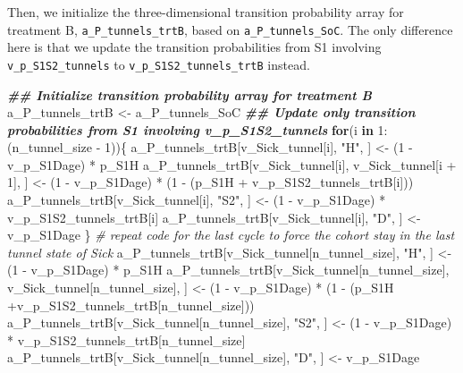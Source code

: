 \documentclass[
]{article}
\newenvironment{Shaded}{\begin{snugshade}}{\end{snugshade}}
\newcommand{\CommentTok}[1]{\textcolor[rgb]{0.56,0.35,0.01}{\textit{#1}}}
\newcommand{\ControlFlowTok}[1]{\textcolor[rgb]{0.13,0.29,0.53}{\textbf{#1}}}
\newcommand{\DecValTok}[1]{\textcolor[rgb]{0.00,0.00,0.81}{#1}}
\newcommand{\DocumentationTok}[1]{\textcolor[rgb]{0.56,0.35,0.01}{\textbf{\textit{#1}}}}
\newcommand{\NormalTok}[1]{#1}
\newcommand{\OtherTok}[1]{\textcolor[rgb]{0.56,0.35,0.01}{#1}}
\newcommand{\SpecialCharTok}[1]{\textcolor[rgb]{0.00,0.00,0.00}{#1}}
\newcommand{\StringTok}[1]{\textcolor[rgb]{0.31,0.60,0.02}{#1}}
\begin{document}
Then, we initialize the three-dimensional transition probability array for treatment B, \texttt{a\_P\_tunnels\_trtB}, based on \texttt{a\_P\_tunnels\_SoC}. The only difference here is that we update the transition probabilities from S1 involving \texttt{v\_p\_S1S2\_tunnels} to \texttt{v\_p\_S1S2\_tunnels\_trtB} instead.

\begin{Shaded}
\begin{Highlighting}[]
\DocumentationTok{\#\# Initialize transition probability array for treatment B}
\NormalTok{a\_P\_tunnels\_trtB }\OtherTok{\textless{}{-}}\NormalTok{ a\_P\_tunnels\_SoC}
\DocumentationTok{\#\# Update only transition probabilities from S1 involving v\_p\_S1S2\_tunnels}
\ControlFlowTok{for}\NormalTok{(i }\ControlFlowTok{in} \DecValTok{1}\SpecialCharTok{:}\NormalTok{(n\_tunnel\_size }\SpecialCharTok{{-}} \DecValTok{1}\NormalTok{))\{}
\NormalTok{  a\_P\_tunnels\_trtB[v\_Sick\_tunnel[i], }\StringTok{"H"}\NormalTok{, ] }\OtherTok{\textless{}{-}}\NormalTok{ (}\DecValTok{1} \SpecialCharTok{{-}}\NormalTok{ v\_p\_S1Dage) }\SpecialCharTok{*}\NormalTok{ p\_S1H}
\NormalTok{  a\_P\_tunnels\_trtB[v\_Sick\_tunnel[i], }
\NormalTok{              v\_Sick\_tunnel[i }\SpecialCharTok{+} \DecValTok{1}\NormalTok{], ] }\OtherTok{\textless{}{-}}\NormalTok{ (}\DecValTok{1} \SpecialCharTok{{-}}\NormalTok{ v\_p\_S1Dage) }\SpecialCharTok{*} 
\NormalTok{                                         (}\DecValTok{1} \SpecialCharTok{{-}}\NormalTok{ (p\_S1H }\SpecialCharTok{+}\NormalTok{ v\_p\_S1S2\_tunnels\_trtB[i]))}
\NormalTok{  a\_P\_tunnels\_trtB[v\_Sick\_tunnel[i], }\StringTok{"S2"}\NormalTok{, ] }\OtherTok{\textless{}{-}}\NormalTok{ (}\DecValTok{1} \SpecialCharTok{{-}}\NormalTok{ v\_p\_S1Dage) }\SpecialCharTok{*}\NormalTok{ v\_p\_S1S2\_tunnels\_trtB[i]}
\NormalTok{  a\_P\_tunnels\_trtB[v\_Sick\_tunnel[i], }\StringTok{"D"}\NormalTok{, ]  }\OtherTok{\textless{}{-}}\NormalTok{ v\_p\_S1Dage}
\NormalTok{\}}
\CommentTok{\# repeat code for the last cycle to force the cohort stay in the last tunnel state of Sick}
\NormalTok{a\_P\_tunnels\_trtB[v\_Sick\_tunnel[n\_tunnel\_size], }\StringTok{"H"}\NormalTok{, ] }\OtherTok{\textless{}{-}}\NormalTok{ (}\DecValTok{1} \SpecialCharTok{{-}}\NormalTok{ v\_p\_S1Dage) }\SpecialCharTok{*}\NormalTok{ p\_S1H}
\NormalTok{a\_P\_tunnels\_trtB[v\_Sick\_tunnel[n\_tunnel\_size],}
\NormalTok{            v\_Sick\_tunnel[n\_tunnel\_size], ] }\OtherTok{\textless{}{-}}\NormalTok{ (}\DecValTok{1} \SpecialCharTok{{-}}\NormalTok{ v\_p\_S1Dage) }\SpecialCharTok{*} 
\NormalTok{                                               (}\DecValTok{1} \SpecialCharTok{{-}}\NormalTok{ (p\_S1H }\SpecialCharTok{+}\NormalTok{v\_p\_S1S2\_tunnels\_trtB[n\_tunnel\_size]))}
\NormalTok{a\_P\_tunnels\_trtB[v\_Sick\_tunnel[n\_tunnel\_size], }\StringTok{"S2"}\NormalTok{, ] }\OtherTok{\textless{}{-}}\NormalTok{ (}\DecValTok{1} \SpecialCharTok{{-}}\NormalTok{ v\_p\_S1Dage) }\SpecialCharTok{*}
\NormalTok{                                                           v\_p\_S1S2\_tunnels\_trtB[n\_tunnel\_size]}
\NormalTok{a\_P\_tunnels\_trtB[v\_Sick\_tunnel[n\_tunnel\_size], }\StringTok{"D"}\NormalTok{, ]  }\OtherTok{\textless{}{-}}\NormalTok{ v\_p\_S1Dage}
\end{Highlighting}
\end{Shaded}
\end{document}
